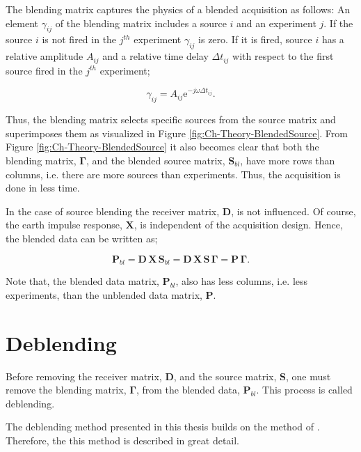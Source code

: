  The blending matrix captures the physics of a blended acquisition as follows: An element $\gamma_{ij}$ of the blending matrix includes a source $i$ and an experiment $j$. If the source $i$ is not fired in the $j^{th}$ experiment $\gamma_{ij}$ is zero. If it is fired, source $i$ has a relative amplitude $A_{ij}$ and a relative time delay $\Delta t_{ij}$ with respect to the first source fired in the $j^{th}$ experiment;

\begin{equation}
	\gamma_{ij} =  A_{ij} \mathrm{e}^{-j \omega \Delta t_{ij}}.
	\label{eq:Ch-Theory-BlendingElement}
\end{equation}  
 
Thus, the blending matrix selects specific sources from the source matrix and superimposes them as visualized in Figure \ref{fig:Ch-Theory-BlendedSource}. From Figure \ref{fig:Ch-Theory-BlendedSource} it also becomes clear that both the blending matrix, $\mathbf{\Gamma}$, and the blended source matrix, $\mathbf{S}_{bl}$, have more rows than columns, i.e. there are more sources than experiments. Thus, the acquisition is done in less time.

In the case of source blending the receiver matrix, $\mathbf{D}$, is not influenced. Of course, the earth impulse response, $\mathbf{X}$, is independent of the acquisition design. Hence, the blended data can be written as;

\begin{equation}
	\mathbf{P}_{bl} = \mathbf{D} \, \mathbf{X} \, \mathbf{S}_{bl} = \mathbf{D} \, \mathbf{X} \, \mathbf{S} \, \mathbf{\Gamma} = \mathbf{P \, \Gamma}.
	\label{eq:Ch-Theory-BlendedData}
\end{equation}

Note that, the blended data matrix, $\mathbf{P}_{bl}$, also has less columns, i.e. less experiments, than the unblended data matrix, $\mathbf{P}$.



\section{Deblending} \label{sec:MahdadMethod}

Before removing the receiver matrix, $\mathbf{D}$, and the source matrix, $\mathbf{S}$, one must remove  the blending matrix, $\mathbf{\Gamma}$, from the blended data, $\mathbf{P}_{bl}$. This process is called deblending.

The deblending method presented in this thesis builds on the method of \citet{Mahdad-Deblending-Method}. Therefore, the this method is described in great detail.

